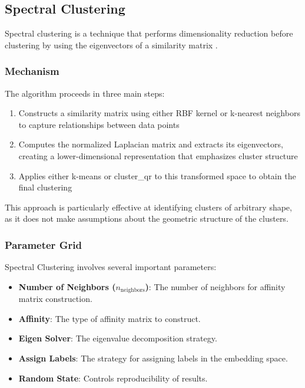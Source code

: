 \subsection{Spectral Clustering}
\label{subsec:methods-spectral-clustering}

Spectral clustering is a technique that performs dimensionality reduction before clustering by using the eigenvectors of a similarity matrix \cite{2018-spectral}.

\subsubsection{Mechanism}

The algorithm proceeds in three main steps:
\begin{enumerate}
    \item Constructs a similarity matrix using either RBF kernel or k-nearest neighbors to capture relationships between data points
    \item Computes the normalized Laplacian matrix and extracts its eigenvectors, creating a lower-dimensional representation that emphasizes cluster structure
    \item Applies either k-means or cluster\_qr to this transformed space to obtain the final clustering
\end{enumerate}

This approach is particularly effective at identifying clusters of arbitrary shape, as it does not make assumptions about the geometric structure of the clusters.

\subsubsection{Parameter Grid}

Spectral Clustering involves several important parameters:

\begin{itemize}
    \item \textbf{Number of Neighbors (\(n_{\text{neighbors}}\))}: The number of neighbors for affinity matrix construction.
    \item \textbf{Affinity}: The type of affinity matrix to construct.
    \item \textbf{Eigen Solver}: The eigenvalue decomposition strategy.
    \item \textbf{Assign Labels}: The strategy for assigning labels in the embedding space.
    \item \textbf{Random State}: Controls reproducibility of results.
\end{itemize}

